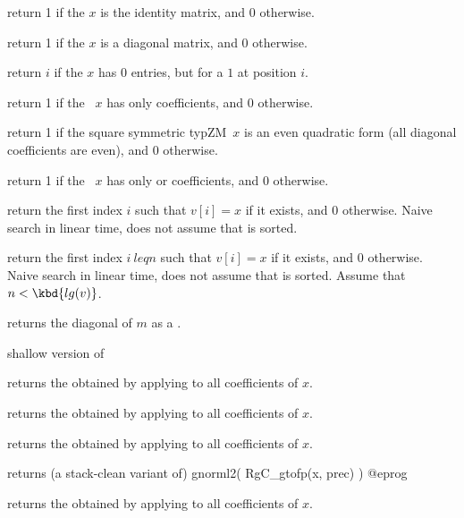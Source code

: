  return 1 if the  $x$ is the
identity matrix, and 0 otherwise.

 return 1 if the  $x$ is a
diagonal matrix, and 0 otherwise.

 return $i$ if the  $x$ has $0$ entries,
but for a $1$ at position $i$.

 return 1 if the ~$x$ has only
 coefficients, and 0 otherwise.

 return 1 if the square symmetric typ{ZM}~$x$
is an even quadratic form (all diagonal coefficients are even), and 0 otherwise.

 return 1 if the ~$x$ has only
 or  coefficients, and 0 otherwise.

 return the first index $i$ such that
$v[i] = x$ if it exists, and $0$ otherwise. Naive search in linear time, does
not assume that  is sorted.

 return the first index $i\ leq n$
such that $v[i] = x$ if it exists, and $0$ otherwise. Naive search in linear
time, does not assume that  is sorted. Assume that $n < \kbd{lg(v)}$.

 returns the diagonal of $m$ as a .

 shallow version of 


 returns the  obtained by
applying  to all coefficients of $x$.

 returns the  obtained by
applying  to all coefficients of $x$.

 returns the  obtained by
applying  to all coefficients of $x$.

 returns (a stack-clean variant of)
\bprog
  gnorml2( RgC_gtofp(x, prec) )
@eprog

 returns the  obtained by
applying  to all coefficients of $x$.

